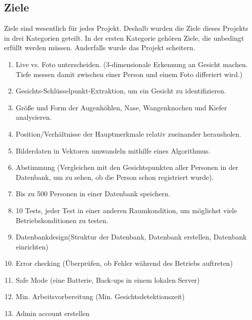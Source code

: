 \subsection{Ziele}
Ziele sind wesentlich für jedes Projekt. Deshalb wurden die Ziele dieses Projekts in drei Kategorien geteilt.
In der ersten Kategorie gehören Ziele, die unbedingt erfüllt werden müssen. Anderfalls wurde das Projekt scheitern.
\begin{enumerate}
	\item Live vs. Foto unterscheiden.
	(3-dimensionale Erkennung an Gesicht machen. Tiefe messen damit zwischen einer Person und einem Foto differiert wird.)
	
	\item Gesichts-Schlüsselpunkt-Extraktion, um ein Gesicht zu identifizieren.
	
	\item Größe und Form der Augenhöhlen, Nase, Wangenknochen und Kiefer analysieren.
	
	\item Position/Verhältnisse der Hauptmerkmale relativ zueinander herausholen.
	
	\item Bilderdaten in Vektoren umwandeln mithilfe eines Algorithmus.
	
	\item Abstimmung (Vergleichen mit den Gesichtspunkten aller Personen in der Datenbank, um zu sehen, ob die Person schon registriert wurde).
	
	\item Bis zu 500 Personen in einer Datenbank speichern.
	
	\item 10 Tests, jeder Test in einer anderen Raumkondition, um m\"oglichst viele Betriebskonditionen zu testen.
	
	\item Datenbankdesign(Struktur der Datenbank, Datenbank erstellen, Datenbank einrichten)
	
	\item Error checking (\"Uberpr\"ufen, ob Fehler w\"ahrend des Betriebs auftreten)
	
	\item Safe Mode (eine Batterie, Back-ups in einem lokalen Server)
	
	\item Min. Arbeitsvorbereitung (Min. Gesichtsdetektionszeit)
	\item Admin account erstellen
	
\end{enumerate}
